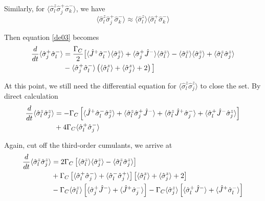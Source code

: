 \documentclass{article}
\newcommand{\gc}{\Gamma_C}
\begin{document}
Similarly, for $\langle \hat{\sigma}^z_l\hat{\sigma}^+_j\hat{\sigma}_k^-\rangle$, we have
\begin{equation}
    \langle \hat{\sigma}^z_l\hat{\sigma}^+_j\hat{\sigma}_k^-\rangle \approx \langle \hat{\sigma}_l^z\rangle \langle\hat{\sigma}_l^+ \hat{\sigma}_k^-\rangle
\end{equation}

Then equation \ref{de03} becomes
\begin{align}
\notag
\frac{d}{dt}\langle\hat{\sigma}^+_j\hat{\sigma}^-_l\rangle&=\frac{\gc}{2}\big[\langle\hat{J}^+\hat{\sigma}_l^-\rangle \langle \hat{\sigma}_j^z\rangle+\langle\hat{\sigma}^+_j\hat{J}^-\rangle \langle \hat{\sigma}_l^z\rangle-\langle\hat{\sigma}_l^z\rangle \langle \hat{\sigma}_j^z\rangle+\langle\hat{\sigma}_l^z \hat{\sigma}_j^z\rangle\\
&-\langle\hat{\sigma}_j^+ \hat{\sigma}_l^-\rangle\left(\langle\hat{\sigma}_l^z\rangle +\langle \hat{\sigma}_j^z\rangle+2\right)\big]
\end{align}

At this point, we still need the differential equation for $\langle\hat{\sigma}_l^z \hat{\sigma}_j^z\rangle$ to close the set. By direct calculation
\begin{align}
\notag
\frac{d}{dt}\langle\hat{\sigma}_l^z \hat{\sigma}_j^z\rangle&=-\gc\left[\langle \hat{J}^+\hat{\sigma}^-_l\hat{\sigma}^z_j\rangle+\langle \hat{\sigma}_l^z\hat{\sigma}^+_j\hat{J}^-\rangle+\langle \hat{\sigma}_l^z\hat{J}^+\hat{\sigma}^-_j\rangle+\langle \hat{\sigma}_l^+\hat{J}^-\hat{\sigma}^z_j\rangle\right]\\
\label{de04}
&+4\gc\langle \hat{\sigma}_l^+\hat{\sigma}^-_j\rangle
\end{align}

Again, cut off the third-order cumulants, we arrive at
\begin{align}
\notag
\frac{d}{dt}\langle\hat{\sigma}_l^z \hat{\sigma}_j^z\rangle&=2\gc\left[\langle\hat{\sigma}_l^z\rangle \langle \hat{\sigma}_j^z\rangle-\langle\hat{\sigma}_l^z \hat{\sigma}_j^z\rangle\right]\\\notag
&+\gc\left[\langle\hat{\sigma}_l^+\hat{\sigma}_j^-\rangle+\langle\hat{\sigma}_l^-\hat{\sigma}_j^+\rangle\right]\left[\langle\hat{\sigma}_l^z\rangle+\langle \hat{\sigma}_j^z\rangle+2\right]\\
&-\gc\langle\hat{\sigma}_l^z\rangle\left[\langle\hat{\sigma}_j^+\hat{J}^-\rangle+\langle\hat{J}^+\hat{\sigma}_j^-\rangle\right]-\gc\langle\hat{\sigma}_j^z\rangle\left[\langle\hat{\sigma}_l^+\hat{J}^-\rangle+\langle\hat{J}^+\hat{\sigma}_l^-\rangle\right]
\end{align}
\end{document}
